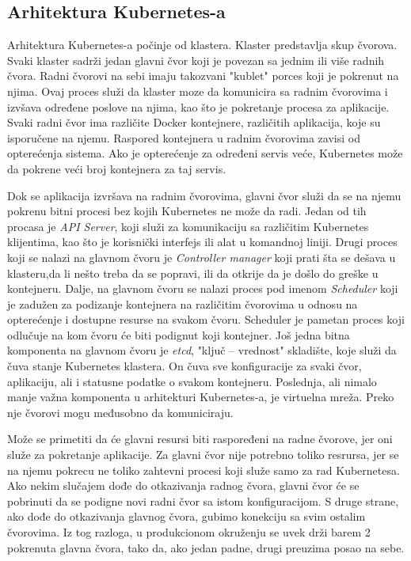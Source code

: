 \subsection{Arhitektura Kubernetes-a}
Arhitektura Kubernetes-a počinje od klastera. Klaster predstavlja skup čvorova. Svaki klaster sadrži
jedan glavni čvor koji je povezan sa jednim ili više radnih čvora. Radni čvorovi na sebi imaju 
takozvani "kublet" porces koji je pokrenut na njima. Ovaj proces služi da klaster moze da komunicira
sa radnim čvorovima i izvšava određene poslove na njima, kao što je pokretanje procesa za aplikacije.
Svaki radni čvor ima različite Docker kontejnere, različitih aplikacija, koje su isporučene na njemu.
Raspored kontejnera u radnim čvorovima zavisi od opterećenja sistema. Ako je opterećenje za određeni 
servis veće, Kubernetes može da pokrene veći broj kontejnera za taj servis. 

Dok se aplikacija izvršava na radnim čvorovima, glavni čvor služi da se na njemu pokrenu bitni procesi 
bez kojih Kubernetes ne može da radi. Jedan od tih procasa je {\em API Server}, koji služi za 
komunikaciju sa različitim Kubernetes klijentima, kao što je korisnički interfejs ili alat u 
komandnoj liniji. Drugi proces koji se nalazi na glavnom čvoru je {\em Controller manager} koji 
prati šta se dešava u klasteru,da li nešto treba da se popravi, ili da otkrije da je došlo do greške 
u kontejneru. Dalje, na glavnom čvoru se nalazi proces pod imenom {\em Scheduler} koji je zadužen 
za podizanje kontejnera na različitim čvorovima u odnosu na opterećenje i dostupne resurse na svakom 
čvoru. Scheduler je pametan proces koji odlučuje na kom čvoru će biti podignut koji kontejner. 
Još jedna bitna komponenta na glavnom čvoru je {\em etcd}, "ključ -- vrednost" skladište, koje služi 
da čuva stanje Kubernetes klastera. On čuva sve konfiguracije za svaki čvor, aplikaciju, ali i statusne 
podatke o svakom kontejneru. Poslednja, ali nimalo manje važna komponenta u arhitekturi Kubernetes-a, 
je virtuelna mreža. Preko nje čvorovi mogu međusobno da komuniciraju. 

Može se primetiti da će glavni resursi biti raspoređeni na radne čvorove, jer oni služe za pokretanje 
aplikacije. Za glavni čvor nije potrebno toliko resrursa, jer se na njemu pokrecu ne toliko zahtevni procesi 
koji služe samo za rad Kubernetesa. Ako nekim slučajem dođe do otkazivanja radnog čvora, glavni čvor 
će se pobrinuti da se podigne novi radni čvor sa istom konfiguracijom. S druge strane, ako dođe do 
otkazivanja glavnog čvora, gubimo konekciju sa svim ostalim čvorovima. Iz tog razloga, u produkcionom 
okruženju se uvek drži barem 2 pokrenuta glavna čvora, tako da, ako jedan padne, drugi preuzima 
posao na sebe.

